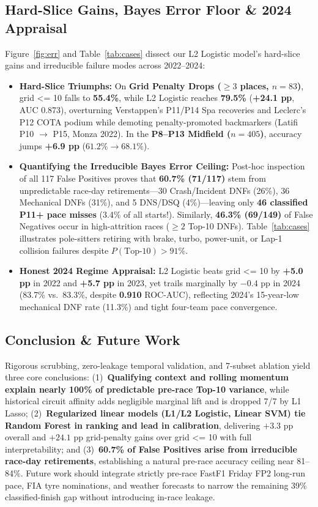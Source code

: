 \documentclass[10pt,a4paper,twocolumn]{article}
\newcommand{\code}[1]{{\fontsize{8.5pt}{10pt}\selectfont\ttfamily #1}}
\begin{document}
\subsection{Hard-Slice Gains, Bayes Error Floor \& 2024 Appraisal}
Figure~\ref{fig:err} and Table~\ref{tab:cases} dissect our L2 Logistic model's hard-slice gains and irreducible failure modes across 2022--2024:
\begin{itemize}
  \item \textbf{Hard-Slice Triumphs:} On \textbf{Grid Penalty Drops ($\ge 3$ places, $n=83$)}, \code{grid <= 10} falls to \textbf{55.4\%}, while L2 Logistic reaches \textbf{79.5\%} (\textbf{+24.1 pp}, AUC 0.873), overturning Verstappen's P11/P14 Spa recoveries and Leclerc's P12 COTA podium while demoting penalty-promoted backmarkers (Latifi P10 $\rightarrow$ P15, Monza 2022). In the \textbf{P8--P13 Midfield ($n=405$)}, accuracy jumps \textbf{+6.9 pp} ($61.2\% \rightarrow 68.1\%$).
  \item \textbf{Quantifying the Irreducible Bayes Error Ceiling:} Post-hoc inspection of all 117 False Positives proves that \textbf{60.7\% (71/117)} stem from unpredictable race-day retirements---30 Crash/Incident DNFs (26\%), 36 Mechanical DNFs (31\%), and 5 DNS/DSQ (4\%)---leaving only \textbf{46 classified P11+ pace misses} (3.4\% of all starts!). Similarly, \textbf{46.3\% (69/149)} of False Negatives occur in high-attrition races ($\ge 2$ Top-10 DNFs). Table~\ref{tab:cases} illustrates pole-sitters retiring with brake, turbo, power-unit, or Lap-1 collision failures despite $P(\text{Top-10}) > 91\%$.
  \item \textbf{Honest 2024 Regime Appraisal:} L2 Logistic beats \code{grid <= 10} by \textbf{+5.0 pp} in 2022 and \textbf{+5.7 pp} in 2023, yet trails marginally by $-0.4$ pp in 2024 (83.7\% vs.\ 83.3\%, despite \textbf{0.910} ROC-AUC), reflecting 2024's 15-year-low mechanical DNF rate (11.3\%) and tight four-team pace convergence.
\end{itemize}

\subsection{Conclusion \& Future Work}
Rigorous scrubbing, zero-leakage temporal validation, and 7-subset ablation yield three core conclusions: (1)~\textbf{Qualifying context and rolling momentum explain nearly 100\% of predictable pre-race Top-10 variance}, while historical circuit affinity adds negligible marginal lift and is dropped 7/7 by L1 Lasso; (2)~\textbf{Regularized linear models (L1/L2 Logistic, Linear SVM) tie Random Forest in ranking and lead in calibration}, delivering $+3.3$ pp overall and $+24.1$ pp grid-penalty gains over \code{grid <= 10} with full interpretability; and (3)~\textbf{60.7\% of False Positives arise from irreducible race-day retirements}, establishing a natural pre-race accuracy ceiling near 81--84\%. Future work should integrate strictly pre-race FastF1 Friday FP2 long-run pace, FIA tyre nominations, and weather forecasts to narrow the remaining 39\% classified-finish gap without introducing in-race leakage.
\end{document}
